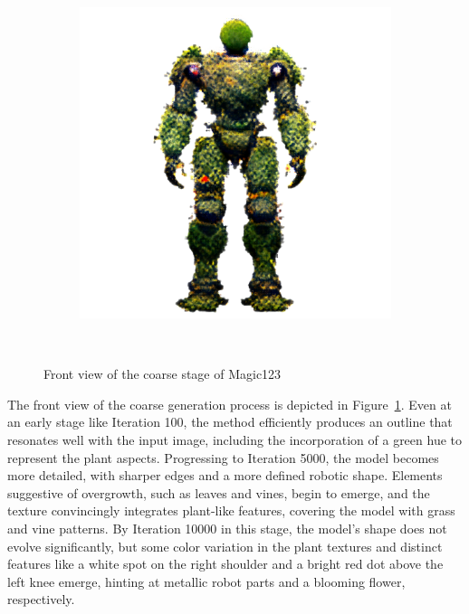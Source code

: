 \begin{figure}[H]
\begin{subfigure}[b]{0.25\textwidth}
        \includegraphics[width=\textwidth]{etc/a robot made out of plants/magic123/magic123_coarse_robot_front_10000_part1.png}
        \caption{}
    \end{subfigure}
    \caption{Front view of the coarse stage of Magic123}~\label{fig:generationFrontCoarseMagic123}
\end{figure}

The front view of the coarse generation process is depicted in Figure~\ref{fig:generationFrontCoarseMagic123}. Even at an early stage like Iteration 100, the method efficiently produces an outline that resonates well with the input image, including the incorporation of a green hue to represent the plant aspects. Progressing to Iteration 5000, the model becomes more detailed, with sharper edges and a more defined robotic shape. Elements suggestive of overgrowth, such as leaves and vines, begin to emerge, and the texture convincingly integrates plant-like features, covering the model with grass and vine patterns. By Iteration 10000 in this stage, the model's shape does not evolve significantly, but some color variation in the plant textures and distinct features like a white spot on the right shoulder and a bright red dot above the left knee emerge, hinting at metallic robot parts and a blooming flower, respectively.

